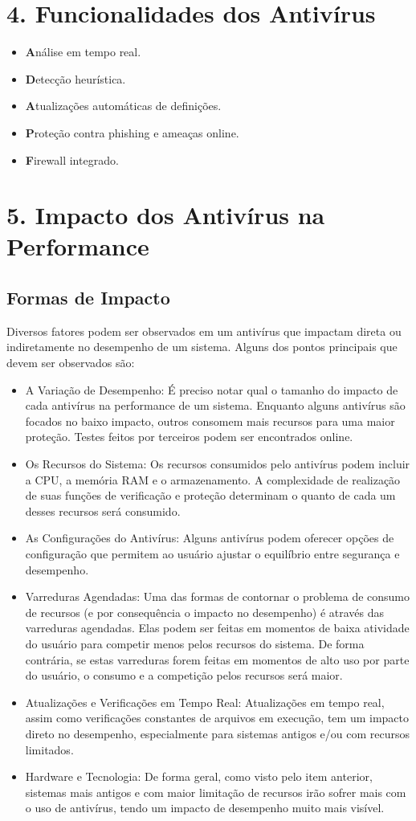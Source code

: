 \documentclass[10pt,conference,twocolumn]{article}
\begin{document}
\section* {4. Funcionalidades dos Antivírus}
 \begin{itemize}
\item \textbf Análise em tempo real.
\item \textbf Detecção heurística.
\item \textbf Atualizações automáticas de definições.
\item \textbf Proteção contra phishing e ameaças online.
\item \textbf Firewall integrado.
\end{itemize}

\section* {5. Impacto dos Antivírus na Performance}
\subsection*{Formas de Impacto}
Diversos fatores podem ser observados em um antivírus que impactam direta ou indiretamente no desempenho de um sistema. Alguns dos pontos principais que devem ser observados são:

\begin{itemize}
\item
A Variação de Desempenho:
É preciso notar qual o tamanho do impacto de cada antivírus na performance de um sistema. Enquanto alguns antivírus são focados no baixo impacto, outros consomem mais recursos para uma maior proteção. Testes feitos por terceiros podem ser encontrados online.
\item
Os Recursos do Sistema:
Os recursos consumidos pelo antivírus podem incluir a CPU, a memória RAM e o armazenamento. A complexidade de realização de suas funções de verificação e proteção determinam o quanto de cada um desses recursos será consumido.
\item
As Configurações do Antivírus:
Alguns antivírus podem oferecer opções de configuração que permitem ao usuário ajustar o equilíbrio entre segurança e desempenho.
\item
Varreduras Agendadas:
Uma das formas de contornar o problema de consumo de recursos (e por consequência o impacto no desempenho) é através das varreduras agendadas. Elas podem ser feitas em momentos de baixa atividade do usuário para competir menos pelos recursos do sistema. De forma contrária, se estas varreduras forem feitas em momentos de alto uso por parte do usuário, o consumo e a competição pelos recursos será maior.
\item
Atualizações e Verificações em Tempo Real:
Atualizações em tempo real, assim como verificações constantes de arquivos em execução, tem um impacto direto no desempenho, especialmente para sistemas antigos e/ou com recursos limitados.
\item
Hardware e Tecnologia:
De forma geral, como visto pelo item anterior, sistemas mais antigos e com maior limitação de recursos irão sofrer mais com o uso de antivírus, tendo um impacto de desempenho muito mais visível.
\end{itemize}
\end{document}
